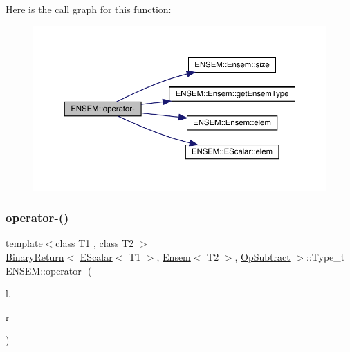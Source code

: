 Here is the call graph for this function\+:\nopagebreak
\begin{figure}[H]
\begin{center}
\leavevmode
\includegraphics[width=350pt]{d1/d9e/group__eensem_ga2ca6914217df099912f3f38239141a55_cgraph}
\end{center}
\end{figure}
\mbox{\label{group__eensem_ga800941462d54db3919bdb1fe8cd1c1b6}} 
\subsubsection{\texorpdfstring{operator-\/()}{operator-()}\hspace{0.1cm}{\footnotesize\ttfamily [4/4]}}
{\footnotesize\ttfamily template$<$class T1 , class T2 $>$ \\
\mbox{\hyperlink{structENSEM_1_1BinaryReturn}{Binary\+Return}}$<$ \mbox{\hyperlink{classENSEM_1_1EScalar}{E\+Scalar}}$<$ T1 $>$, \mbox{\hyperlink{classENSEM_1_1Ensem}{Ensem}}$<$ T2 $>$, \mbox{\hyperlink{structENSEM_1_1OpSubtract}{Op\+Subtract}} $>$\+::Type\+\_\+t E\+N\+S\+E\+M\+::operator-\/ (\begin{DoxyParamCaption}\item[{const \mbox{\hyperlink{classENSEM_1_1EScalar}{E\+Scalar}}$<$ T1 $>$ \&}]{l,  }\item[{const \mbox{\hyperlink{classENSEM_1_1Ensem}{Ensem}}$<$ T2 $>$ \&}]{r }\end{DoxyParamCaption})\hspace{0.3cm}{\ttfamily [inline]}}

